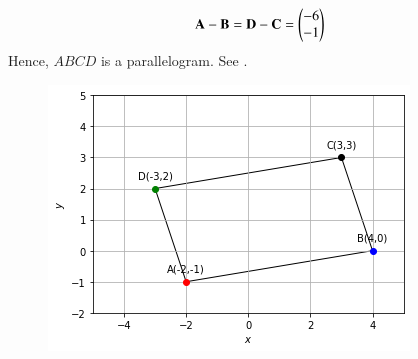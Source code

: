 \begin{align}
\mathbf{A}-\mathbf{B} = 
\mathbf{D}-\mathbf{C} =  \begin{pmatrix}-6\\-1\end{pmatrix}
\end{align}
Hence, $ABCD$ is a parallelogram.
See .
\begin{figure}[h!]
  \centering
   \includegraphics[width=\columnwidth]{chapters/11/10/1/9/figs/paralellogram.png}
    \caption{}
     \label{fig:chapters/11/10/1/91}  
\end{figure}



